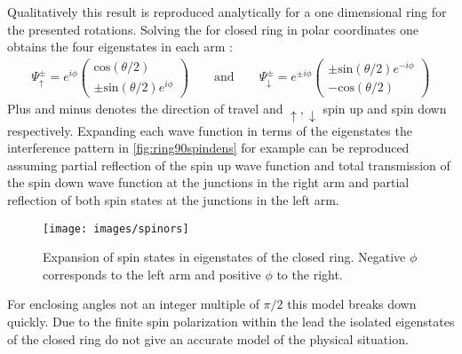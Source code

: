 Qualitatively this result is reproduced analytically for a one dimensional ring for the presented rotations. Solving the \hamil{} for closed ring in polar coordinates one obtains the four eigenstates in each arm \cite{nitta1999.695}:
\begin{align}
\Psi^{\pm}_{\uparrow} = e^{i\phi}\begin{pmatrix}\text{cos}(\theta/2)\\\pm\text{sin}(\theta/2)e^{i\phi}\end{pmatrix} 
\qquad\text{and}\qquad
\Psi^{\pm}_{\downarrow} = e^{\pm i\phi}\begin{pmatrix}\pm\text{sin}(\theta/2)e^{-i\phi}\\-\text{cos}(\theta/2)\end{pmatrix}
\end{align}
Plus and minus denotes the direction of travel and $\uparrow,\downarrow$ spin up and spin down respectively. Expanding each wave function in terms of the eigenstates the interference pattern in \cref{fig:ring90spindens} for example can be reproduced assuming partial reflection of the spin up wave function and total transmission of the spin down wave function at the junctions in the right arm and partial reflection of both spin states at the junctions in the left arm. 
\begin{figure}[!h]
\centering
\texttt{[image: images/spinors]}
\caption{Expansion of spin states in eigenstates of the closed ring. Negative $\phi$ corresponds to the left arm and positive $\phi$ to the right.}
\end{figure}
For enclosing angles not an integer multiple of $\pi/2$ this model breaks down quickly. Due to the finite spin polarization within the lead the isolated eigenstates of the closed ring do not give an accurate model of the physical situation.
